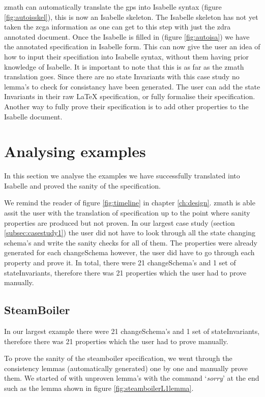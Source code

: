 \Gls{zmath} can automatically translate the \gls{gps} into Isabelle syntax (figure \ref{fig:autoisskel}), this is now an Isabelle skeleton. The Isabelle skeleton has not yet taken the \gls{zcga} information as one can get to this step with just the \gls{zdra} annotated document. Once the Isabelle is filled in (figure \ref{fig:autoisa}) we have the annotated specification in Isabelle form. This can now give the user an idea of how to input their specifiation into Isabelle syntax, without them having prior knowledge of Isabelle. It is important to note that this is as far as the \gls{zmath} translation goes. Since there are no state Invariants with this case study no lemma's to check for consistancy have been generated. The user can add the state Invariants in their raw \LaTeX{} specification, or fully formalise their specification. Another way to fully prove their specification is to add other properties to the Isabelle document.

\section{Analysing examples}

In this section we analyse the examples we have successfully translated into Isabelle and proved the sanity of the specification. 


We remind the reader of figure \ref{fig:timeline} in chapter \ref{ch:design}. \Gls{zmath} is able assit the user with the translation of specification up to the point where sanity properties are produced but not proven. In our largest case study (section \ref{subsec:casestudy1}) the user did not have to look through all the state changing schema's and write the sanity checks for all of them. The properties were already generated for each changeSchema however, the user did have to go through each property and prove it. In total, there were 21 changeSchema's and 1 set of stateInvariants, therefore there was 21 properties which the user had to prove manually.

\subsection{SteamBoiler}

In our largest example there were 21 changeSchema's and 1 set of stateInvariants, therefore there was 21 properties which the user had to prove manually.

To prove the sanity of the steamboiler specification, we went through the consistency lemmas (automatically generated) one by one and manually prove them. We started of with unproven lemma's with the command `\emph{sorry}' at the end such as the lemma shown in figure \ref{fig:steamboilerL1lemma}.

